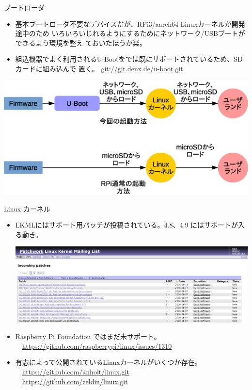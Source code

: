 \begin{frame}{ブートローダ}

\begin{itemize}
\item 基本ブートローダ不要なデバイスだが、RPi3/aarch64 Linuxカーネルが開発途中のため
いろいろいじれるようにするためにネットワーク/USBブートができるよう環境を整え
ておいたほうが楽。
\item 組込機器でよく利用されるU-Bootをでは既にサポートされているため、SDカードに組み込んで
置く。
	{\small \url{git://git.denx.de/u-boot.git}}
\end{itemize}

\begin{center}
\includegraphics[width=0.8\hsize]{image201606/boot.eps}
\end{center}

\end{frame}

\begin{frame}{Linux カーネル}

\begin{itemize}
  \item LKMLにはサポート用パッチが投稿されている。4.8、4.9 にはサポートが入る動き。
  \begin{center}
  \includegraphics[width=0.8\hsize]{image201606/patchwork.png}
  \end{center}
  \item Raspberry Pi Foundation ではまだ未サポート。 \\
   \ \ {\small \url{https://github.com/raspberrypi/linux/issues/1310}}
  \item 有志によって公開されているLinuxカーネルがいくつか存在。\\
    \ \ {\small \url{https://github.com/anholt/linux.git}} \\
    \ \ {\small \url{https://github.com/zeldin/linux.git}} \\
\end{itemize}

\end{frame}

